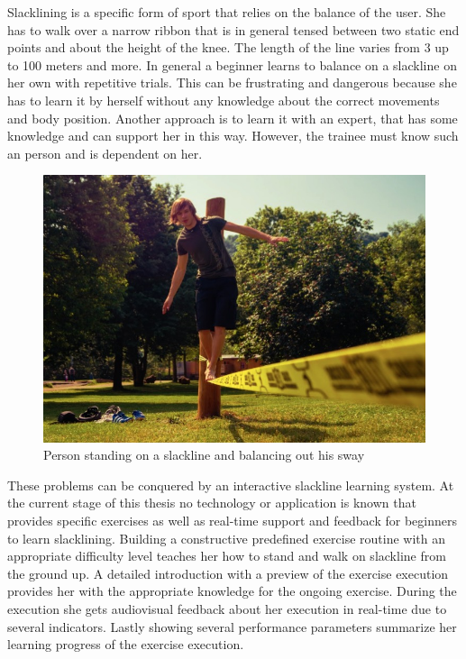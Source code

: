 Slacklining is a specific form of sport that relies on the balance of the user. She has to walk over a narrow ribbon that is in general tensed between two static end points and about the height of the knee. The length of the line varies from 3 up to 100 meters and more. In general a beginner learns to balance on a slackline on her own with repetitive trials. This can be frustrating and dangerous because she has to learn it by herself without any knowledge about the correct movements and body position. Another approach is to learn it with an expert, that has some knowledge and can support her in this way. However, the trainee must know such an person and is dependent on her.
\begin{figure}[htb]
	\centering
	\begin{minipage}[t]{1\linewidth}
		\centering
		\includegraphics[width=0.7\linewidth]{Pictures/1_slackline}
		\caption{Person standing on a slackline and balancing out his sway}
		\label{fig:1_slackline}
	\end{minipage}
\end{figure}

These problems can be conquered by an interactive slackline learning system. At the current stage of this thesis no technology or application is known that provides specific exercises as well as real-time support and feedback for beginners to learn slacklining. Building a constructive predefined exercise routine with an appropriate difficulty level teaches her how to stand and walk on slackline from the ground up. A detailed introduction with a preview of the exercise execution provides her with the appropriate knowledge for the ongoing exercise. During the execution she gets audiovisual feedback about her execution in real-time due to several indicators. Lastly showing several performance parameters summarize her learning progress of the exercise execution.



